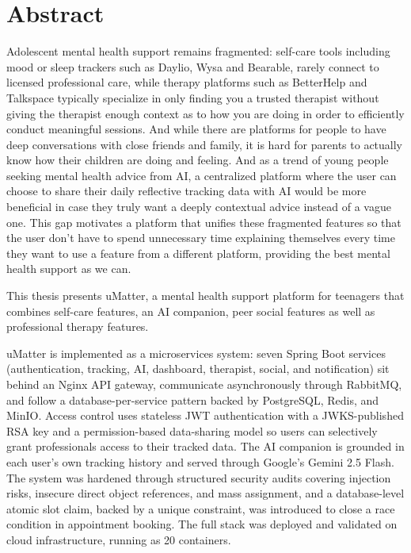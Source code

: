 \chapter*{Abstract}
\label{summary}

Adolescent mental health support remains fragmented: self-care tools including mood or sleep trackers such as Daylio, Wysa and Bearable, rarely connect to licensed professional care, while therapy platforms such as BetterHelp and Talkspace typically specialize in only finding you a trusted therapist without giving the therapist enough context as to how you are doing in order to efficiently conduct meaningful sessions. And while there are platforms for people to have deep conversations with close friends and family, it is hard for parents to actually know how their children are doing and feeling. And as a trend of young people seeking mental health advice from AI, a centralized platform where the user can choose to share their daily reflective tracking data with AI would be more beneficial in case they truly want a deeply contextual advice instead of a vague one. This gap motivates a platform that unifies these fragmented features so that the user don't have to spend unnecessary time explaining themselves every time they want to use  a feature from a different platform, providing the best mental health support as we can.

This thesis presents uMatter, a mental health support platform for teenagers that combines self-care features, an AI companion, peer social features as well as professional therapy features.

uMatter is implemented as a microservices system: seven Spring Boot services (authentication, tracking, AI, dashboard, therapist, social, and notification) sit behind an Nginx API gateway, communicate asynchronously through RabbitMQ, and follow a database-per-service pattern backed by PostgreSQL, Redis, and MinIO. Access control uses stateless JWT authentication with a JWKS-published RSA key and a permission-based data-sharing model so users can selectively grant professionals access to their tracked data. The AI companion is grounded in each user's own tracking history and served through Google's Gemini 2.5 Flash. The system was hardened through structured security audits covering injection risks, insecure direct object references, and mass assignment, and a database-level atomic slot claim, backed by a unique constraint, was introduced to close a race condition in appointment booking. The full stack was deployed and validated on cloud infrastructure, running as 20 containers.

